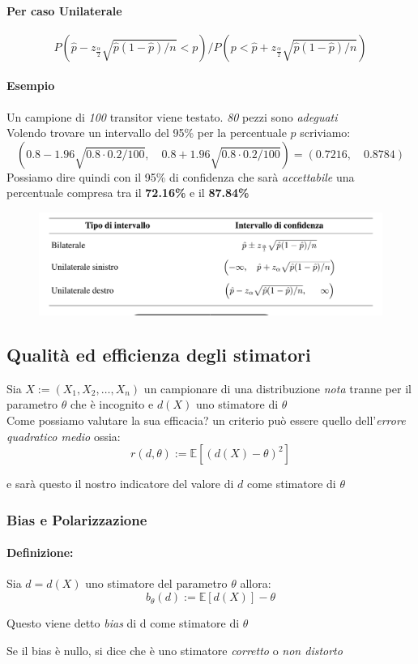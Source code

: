 \documentclass[]{article}
\newcommand{\ev}{\mathbb{E}[X]}
\renewcommand{\ev}[1]{\mathbb{E}\left[#1\right]}
\newcommand{\definizione}{\paragraph{Definizione:}}
\begin{document}
    \paragraph{Per caso Unilaterale}
    \[ P \left(\hat{p} - z_{\frac{\alpha}{2}} \sqrt{\hat{p} (1- \hat{p}) /n} < p \right) / P \left(p < \hat{p} + z_{\frac{\alpha}{2}} \sqrt{\hat{p} (1-\hat{p}) / n} \right)\]
    \paragraph{Esempio} Un campione di \textit{100} transitor viene testato. \textit{80} pezzi sono \textit{adeguati} \\
    Volendo trovare un intervallo del 95\% per la percentuale $p$ scriviamo:
    \[ \left(0.8 - 1.96 \sqrt{0.8 \cdot 0.2 / 100}, \quad 0.8 + 1.96 \sqrt{0.8 \cdot 0.2 / 100} \right) = (0.7216, \quad 0.8784) \]
    Possiamo dire quindi con il 95\% di confidenza che sarà \textit{accettabile} una percentuale compresa tra il \textbf{72.16\%} e il \textbf{87.84\%}
    \begin{figure}[H]
        \includegraphics[width=\textwidth]{images/boh_3.png}
    \end{figure}
    \subsection{Qualità ed efficienza degli stimatori}
    Sia $X := (X_1, X_2, \ldots, X_n)$ un campionare di una distribuzione \textit{nota} tranne per il parametro $\theta$ che è incognito e $d(X)$ uno stimatore di $\theta$ \\
    Come possiamo valutare la sua efficacia? un criterio può essere quello dell'\textit{errore quadratico medio} ossia:
    \[ r(d, \theta) := \ev{(d(X) - \theta)^2} \]
    \centerline{e sarà questo il nostro indicatore del valore di $d$ come stimatore di $\theta$}
    \subsubsection{Bias e Polarizzazione}
    \definizione Sia $d= d(X)$ uno stimatore del parametro $\theta$ allora:
    \[ b_\theta (d) := \ev{d(X)} - \theta \]
    \centerline{Questo viene detto \textit{bias} di d come stimatore di $\theta$}
    \centerline{Se il bias è nullo, si dice che è uno stimatore \textit{corretto} o \textit{non distorto} }
\end{document}
